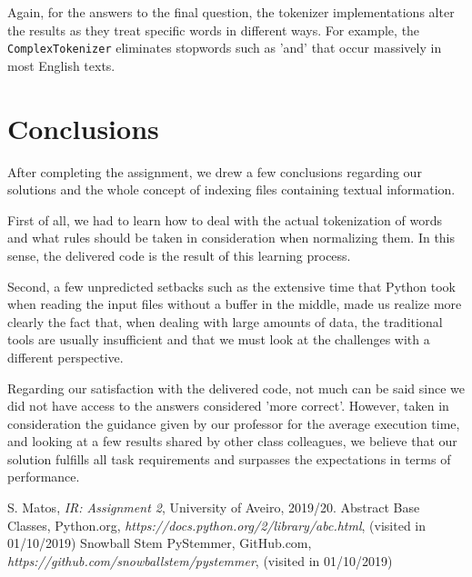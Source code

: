 \documentclass[12pt]{article}
\begin{document}
Again, for the answers to the final question, the tokenizer implementations
alter the results as they treat specific words in different ways.
For example, the \texttt{ComplexTokenizer} eliminates stopwords such as 'and'
that occur massively in most English texts.

\newpage
\section*{Conclusions}

After completing the assignment, we drew a few conclusions regarding our
solutions and the whole concept of indexing files containing textual information.

First of all, we had to learn how to deal with the actual tokenization of 
words and what rules should be taken in consideration when normalizing them.
In this sense, the delivered code is the result of this learning process.

Second, a few unpredicted setbacks such as the extensive time that Python 
took when reading the input files without a buffer in the middle, made us 
realize more clearly the fact that, when dealing with large amounts of data,
the traditional tools are usually insufficient and that we must look at the 
challenges with a different perspective.

Regarding our satisfaction with the delivered code, not much can be said
since we did not have access to the answers considered 'more correct'.
However, taken in consideration the guidance given by our professor for 
the average execution time, and looking at a few results shared by other 
class colleagues, we believe that our solution fulfills all task requirements
and surpasses the expectations in terms of performance.

\begin{thebibliography}{9}
  

    S. Matos,
    \textit{IR: Assignment 2},
    University of Aveiro,
    2019/20.
    Abstract Base Classes,
    Python.org,
    \textit{https://docs.python.org/2/library/abc.html},
    (visited in 01/10/2019)
    Snowball Stem PyStemmer,
    GitHub.com,
    \textit{https://github.com/snowballstem/pystemmer},
    (visited in 01/10/2019)
  
\end{thebibliography}

\clearpage
\end{document}
